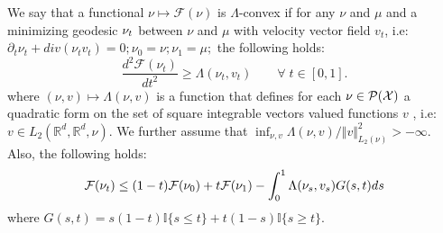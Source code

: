 %
\begin{definition}\label{def:lambda-convexity}
	We say that a functional $\nu\mapsto\mathcal{F}(\nu)$ is $\Lambda$-convex
	if for any $\nu$ and $\mu$ and a minimizing geodesic $\text{\ensuremath{\nu_{t}}}$
	between $\nu$ and $\mu$ with velocity vector field $v_{t}$, i.e:
	$\partial_{t}\nu_{t}+div(\nu_{t}v_{t})=0;\nu_{0}=\nu;\nu_{1}=\mu;$
	the following holds:
	\begin{equation}\label{eq:lambda_displacement_convex}
	\frac{d^{2}\mathcal{F}(\nu_{t})}{dt^{2}}\geq\Lambda(\nu_{t},v_{t})\qquad\forall\; t\in[0,1].
	\end{equation}
	where $(\nu,v)\mapsto\Lambda(\nu,v)$
	is a function that defines for each $\nu \in \mathcal{P}({{\mathcal X}})$
	a quadratic form on the set of square integrable vectors valued functions
	$v$ , i.e: $v\in L_{2}(\mathbb{R}^{d},\mathbb{R}^{d},\nu)$. We
	further assume that $\inf_{\nu,v}\Lambda(\nu,v)/\Vert v\Vert_{L_{2}(\nu)}^{2}>-\infty$. 
	Also, the following holds:
	\begin{equation}\label{eq:integral_lambda_convexity}
	{{\mathcal F}}(\nu_{t})\leq(1-t){{\mathcal F}}(\nu_{0})+t{{\mathcal F}}(\nu_{1})-\int_{0}^{1}\Lambda(\nu_{s},v_{s})G(s,t)ds
	\end{equation}
	where $G(s,t)=s(1-t) \mathbb{I}\{s\leq t\}
	+t(1-s) \mathbb{I}\{s\geq t\}$.
\end{definition}

